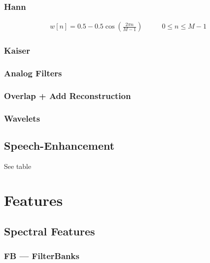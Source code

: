 \subsection{Hann}
\begin{align}
    w[n] = 0.5 - 0.5\cos\left( \frac{ 2\pi n }{ M - 1 } \right) & \qquad 0 \leq n \leq M-1
\end{align}


\subsection{Kaiser}
\subsection{Analog Filters}

\subsection{Overlap + Add Reconstruction}
\subsection{Wavelets}

\section{Speech-Enhancement}
See table








\chapter{Features}
\section{Spectral Features}
\subsection{FB --- FilterBanks}
